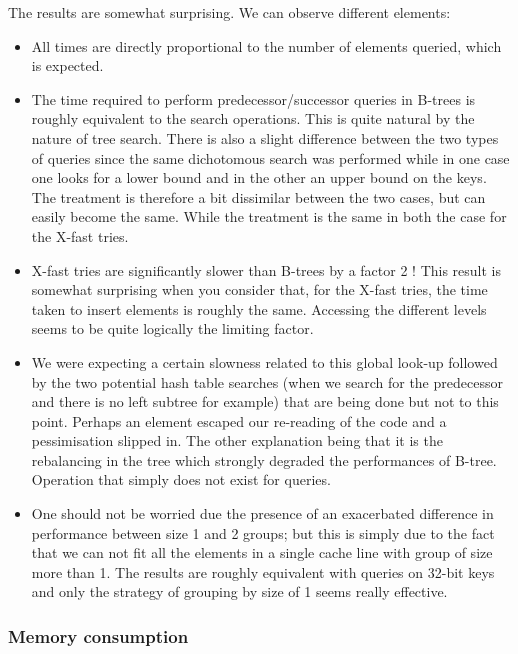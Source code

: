 The results are somewhat surprising. We can observe different elements:
\begin{itemize}
    \item All times are directly proportional to the number of elements queried, which is expected.
    \item The time required to perform predecessor/successor queries in B-trees is roughly equivalent to the search operations. This is quite natural by the nature of tree search. There is also a slight difference between the two types of queries since the same dichotomous search was performed while in one case one looks for a lower bound and in the other an upper bound on the keys. The treatment is therefore a bit dissimilar between the two cases, but can easily become the same. While the treatment is the same in both the case for the X-fast tries.
    \item X-fast tries are significantly slower than B-trees by a factor 2 ! This result is somewhat surprising when you consider that, for the X-fast tries, the time taken to insert elements is roughly the same. Accessing the different levels seems to be quite logically the limiting factor.
    \item We were expecting a certain slowness related to this global look-up followed by the two potential hash table searches (when we search for the predecessor and there is no left subtree for example) that are being done but not to this point. Perhaps an element escaped our re-reading of the code and a pessimisation slipped in. The other explanation being that it is the rebalancing in the tree which strongly degraded the performances of B-tree. Operation that simply does not exist for queries.
    \item One should not be worried due the presence of an exacerbated difference in performance between size 1 and 2 groups; but this is simply due to the fact that we can not fit all the elements in a single cache line with group of size more than 1. The results are roughly equivalent with queries on 32-bit keys and only the strategy of grouping by size of 1 seems really effective.\\
\end{itemize}

\subsubsection{Memory consumption}


